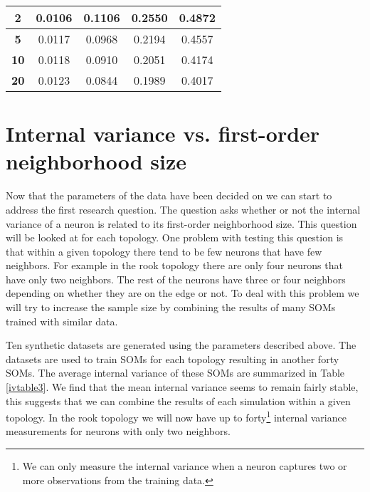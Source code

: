 \begin{table}
{\begin{tabular}{|c||c|c|c|c|}
  \hline
  \textbf{2} & 0.0106& 0.1106& 0.2550& 0.4872 \\
  \hline
  \textbf{5} & 0.0117& 0.0968& 0.2194& 0.4557 \\
  \hline
  \textbf{10} & 0.0118& 0.0910& 0.2051& 0.4174 \\
  \hline
  \textbf{20} & 0.0123& 0.0844& 0.1989& 0.4017 \\
  \hline
  \end{tabular} 
  \label{ivtable1:graph}
} 
\end{table}

\section{Internal variance vs. first-order neighborhood size}
Now that the parameters of the data have been decided on we can start to
address the first research question. The question asks whether or not the
internal variance of a neuron is related to its first-order neighborhood size.
This question will be looked at for each topology.  One problem with testing
this question is that within a given topology there tend to be few neurons
that have few neighbors.  For example in the rook topology there are only four
neurons that have only two neighbors. The rest of the neurons have three or
four neighbors depending on whether they are on the edge or not. To deal with
this problem we will try to increase the sample size by combining the results
of many SOMs trained with similar data.

Ten synthetic datasets are generated using the parameters described above. The
datasets are used to train SOMs for each topology resulting in another forty
SOMs. The average internal variance of these SOMs are summarized in Table
\ref{ivtable3}.  We find that the mean internal variance seems to remain
fairly stable, this suggests that we can combine the results of each
simulation within a given topology. In the rook topology we will now have up
to forty\footnote{We can only measure the internal variance when a neuron
captures two or more observations from the training data.} internal variance
measurements for neurons with only two neighbors.

